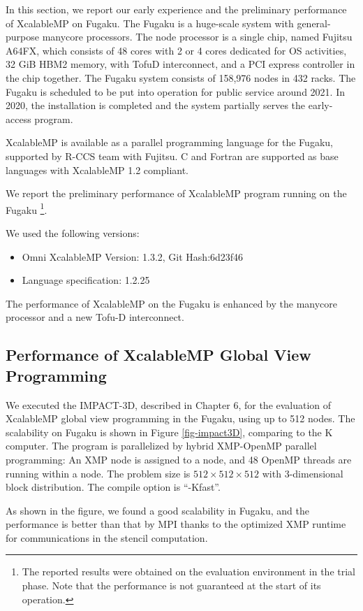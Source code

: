 ﻿\documentclass[graybox]{svmult}
\begin{document}
In this section, we report our early experience and the preliminary performance of XcalableMP on Fugaku.
The Fugaku is a huge-scale system with general-purpose manycore processors.
The node processor is a single chip, named Fujitsu A64FX, which consists of 48 cores with 2 or 4 cores dedicated for OS activities, 32 GiB HBM2 memory, with TofuD interconnect, and a PCI express controller in the chip together.
The Fugaku system consists of 158,976 nodes in 432 racks.
The Fugaku is scheduled to be put into operation for public service around 2021. In 2020, the installation is completed and the system partially serves the early-access program. 

XcalableMP is available as a parallel programming language for the Fugaku, supported by R-CCS team with Fujitsu. C and Fortran are supported as base languages with XcalableMP 1.2 compliant.

We report the preliminary performance of XcalableMP program running on the Fugaku
\footnote{
The reported results were obtained on the evaluation environment in the trial phase.
Note that the performance is not guaranteed at the start of its operation.}.

We used the following versions:
\begin{itemize}
\item Omni XcalableMP Version: 1.3.2, Git Hash:6d23f46
\item Language specification: 1.2.25
\end{itemize}

The performance of XcalableMP on the Fugaku is enhanced by the manycore processor and a new Tofu-D interconnect.  

\subsection{Performance of XcalableMP Global View Programming}

We executed the IMPACT-3D, described in Chapter 6, for the evaluation of XcalableMP global view programming in the Fugaku, using up to 512 nodes.
The scalability on Fugaku is shown in Figure \ref{fig-impact3D},
comparing to the K computer. The program is parallelized by hybrid XMP-OpenMP parallel programming: An XMP node is assigned to a node, and 48 OpenMP threads are running within a node. The problem size is $512 \times 512 \times 512$ with 3-dimensional block distribution. The compile option is ``-Kfast''.

As shown in the figure, we found a good scalability in Fugaku, and the performance is better than that by MPI thanks to the optimized XMP runtime for communications in the stencil computation\cite{Murai2013}.
\end{document}

